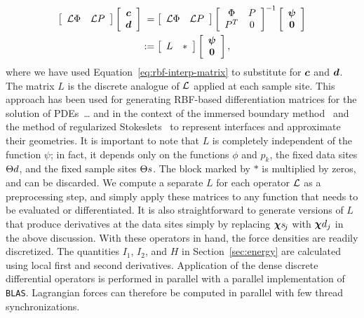 \begin{equation}\label{eq:rbf-operator}
    \begin{aligned}
    \left[\begin{array}{cc}
            \mathcal{L}\Phi & \mathcal{L} P
    \end{array}\right]\left[\begin{array}{c}
            \boldsymbol{c} \\ \boldsymbol{d}
    \end{array}\right] &\hphantom{:}=
    \left[\begin{array}{cc}
            \mathcal{L}\Phi & \mathcal{L} P
    \end{array}\right]\left[\begin{array}{cc}
            \Phi & P \\ P^T & 0
    \end{array}\right]^{-1}\left[\begin{array}{c}
            \boldsymbol{\psi} \\ \boldsymbol{0}
    \end{array}\right] \\ &:=
    \left[\begin{array}{cc}
            L & \ast
    \end{array}\right]\left[\begin{array}{c}
            \boldsymbol{\psi} \\ \boldsymbol{0}
    \end{array}\right],
\end{aligned}
\end{equation}
where we have used Equation~\eqref{eq:rbf-interp-matrix} to substitute for $\boldsymbol{c}$ and
$\boldsymbol{d}$. The matrix $L$ is the discrete analogue of $\mathcal{L}$ applied at each sample site.
This approach has been used for generating RBF-based differentiation matrices for the
solution of PDEs~\cite{Fasshauer:2007ui}{\XXX\ldots} and in the context of the immersed
boundary method~\cite{Shankar:2015km} and the method of regularized Stokeslets~%
\cite{Olson:2015ja} to represent interfaces and approximate their geometries. It is
important to note that $L$ is completely independent of the function $\psi$; in fact, it
depends only on the functions $\phi$ and $p_k$, the fixed data sites $\data\sites$, and
the fixed sample sites $\sample\sites$.  The block marked by $\ast$ is multiplied by
zeros, and can be discarded. We compute a separate $L$ for each operator $\mathcal{L}$ as a
preprocessing step, and simply apply these matrices to any function that needs to be
evaluated or differentiated. It is also straightforward to generate versions of $L$ that
produce derivatives at the data sites simply by replacing $\Xpsj$ with $\data\Xp_j$ in
the above discussion. With these operators in hand, the force densities are readily
discretized. The quantities $I_1$, $I_2$, and $H$ in Section~\ref{sec:energy} are
calculated using local first and second derivatives. Application of the dense discrete
differential operators is performed in parallel with a parallel implementation of
\texttt{BLAS}. Lagrangian forces can therefore be computed in parallel with few thread
synchronizations.


